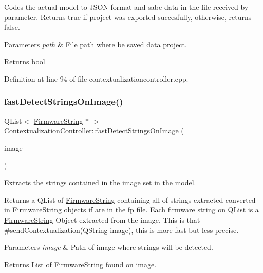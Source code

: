 Codes the actual model to J\+S\+ON format and sabe data in the file received by parameter. Returns true if project was exported succesfully, otherwise, returns false. 
\begin{DoxyParams}{Parameters}
{\em path} & File path where be saved data project. \\
\hline
\end{DoxyParams}
\begin{DoxyReturn}{Returns}
bool 
\end{DoxyReturn}


Definition at line 94 of file contextualizationcontroller.\+cpp.

\mbox{\label{classContextualizationController_a4afb43a5914ef1c7e2a6bb9357cdd822}} 
\subsubsection{\texorpdfstring{fast\+Detect\+Strings\+On\+Image()}{fastDetectStringsOnImage()}}
{\footnotesize\ttfamily Q\+List$<$ \mbox{\hyperlink{classFirmwareString}{Firmware\+String}} $\ast$ $>$ Contextualization\+Controller\+::fast\+Detect\+Strings\+On\+Image (\begin{DoxyParamCaption}\item[{Q\+String}]{image }\end{DoxyParamCaption})\hspace{0.3cm}{\ttfamily [protected]}}



Extracts the strings contained in the image set in the model. 

Returns a Q\+List of \mbox{\hyperlink{classFirmwareString}{Firmware\+String}} containing all of strings extracted converted in \mbox{\hyperlink{classFirmwareString}{Firmware\+String}} objects if are in the fp file. Each firmware string on Q\+List is a \mbox{\hyperlink{classFirmwareString}{Firmware\+String}} Object extracted from the image. This is that \#send\+Contextualization(\+Q\+String image), this is more fast but less precise. 
\begin{DoxyParams}{Parameters}
{\em image} & Path of image where strings will be detected. \\
\hline
\end{DoxyParams}
\begin{DoxyReturn}{Returns}
List of \mbox{\hyperlink{classFirmwareString}{Firmware\+String}} found on image. 
\end{DoxyReturn}


